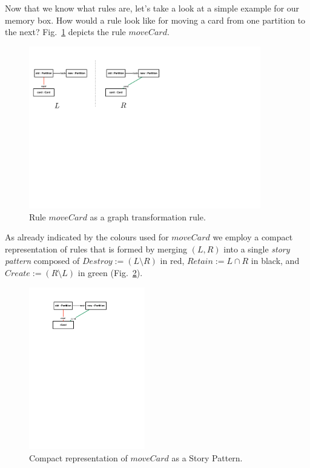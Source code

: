 Now that we know what rules are, let's take a look at a simple example for our
memory box. How would a rule look like for moving a card from one partition to
the next?  Fig.~\ref{fig:rule_example} depicts the rule $moveCard$.
  
\begin{figure}[htp]
\begin{center}
  \includegraphics[width=0.9\textwidth]{pics/rule_example}
  \caption[]{Rule $moveCard$ as a graph transformation rule.}	
  \label{fig:rule_example}
\end{center}
\end{figure}

\clearpage

As already indicated by the colours used for $moveCard$ we employ a compact
representation of rules that is formed by merging $(L,R)$ into a single
\emph{story pattern} composed of  $Destroy := (L\setminus R)$ in red, $Retain := 
L\cap R$ in black, and $Create := (R\setminus L)$ in  green
(Fig.~\ref{fig:rule_compact}).
\begin{figure}[htp]
\begin{center}
  \includegraphics[width=0.45\textwidth]{pics/rule_compact}
  \caption[]{Compact representation of $moveCard$ as a Story Pattern.}
  \label{fig:rule_compact}
\end{center}
\end{figure}

